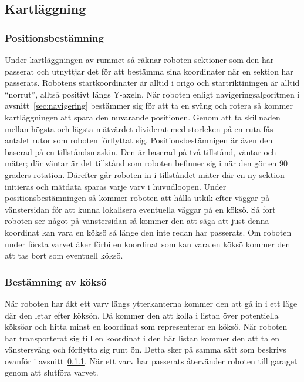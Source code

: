 \documentclass{article}
\begin{document}
\subsection{Kartläggning}
\subsubsection{Positionsbestämning}
\label{sec:position}
Under kartläggningen av rummet så räknar roboten sektioner som den har passerat och utnyttjar det för att bestämma sina koordinater när en sektion har passerats. Robotens startkoordinater är alltid i origo och startriktiningen är alltid ``norrut'', alltså positivt längs Y-axeln. När roboten enligt navigeringsalgoritmen i avsnitt~\ref{sec:navigering} bestämmer sig för att ta en sväng och rotera så kommer kartläggningen att spara den nuvarande positionen. Genom att ta skillnaden mellan högsta och lägsta mätvärdet dividerat med storleken på en ruta fås antalet rutor som roboten förflyttat sig. Positionsbestämnigen är även den baserad på en tillståndsmaskin. Den är baserad på två tillstånd, väntar och mäter; där väntar är det tillstånd som roboten befinner sig i när den gör en 90 graders rotation. Därefter går roboten in i tillståndet mäter där en ny sektion initieras och mätdata sparas varje varv i huvudloopen.\newline \newline
Under positionsbestämningen så kommer roboten att hålla utkik efter väggar på vänstersidan för att kunna lokalisera eventuella väggar på en köksö. Så fort roboten ser något på vänstersidan så kommer den att säga att just denna koordinat kan vara en köksö så länge den inte redan har passerats. Om roboten under första varvet åker förbi en koordinat som kan vara en köksö kommer den att tas bort som eventuell köksö.

\subsubsection{Bestämning av köksö}
När roboten har åkt ett varv längs ytterkanterna kommer den att gå in i ett läge där den letar efter köksön. Då kommer den att kolla i listan över potentiella köksöar och hitta minst en koordinat som representerar en köksö. När roboten har transporterat sig till en koordinat i den här listan kommer den att ta en vänstersväng och förflytta sig runt ön. Detta sker på samma sätt som beskrivs ovanför i avsnitt~\ref{sec:position}. När ett varv har passerats återvänder roboten till garaget genom att slutföra varvet. 
\end{document}
